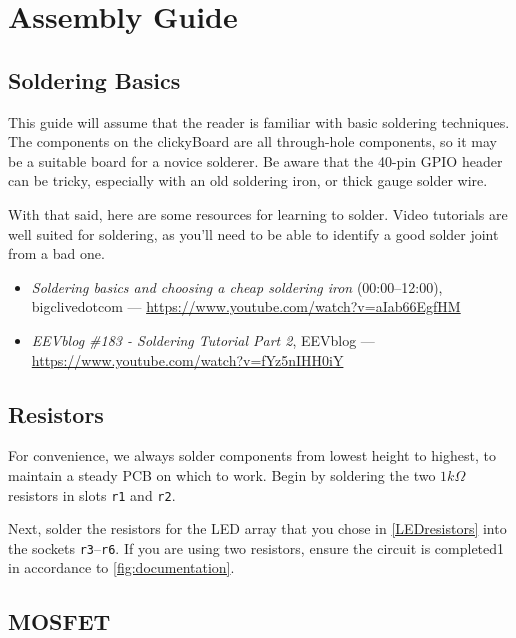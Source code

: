 \documentclass[10pt, a4paper, onesided]{article}
\begin{document}

\newpage
\section{Assembly Guide}

	\subsection*{Soldering Basics}
		This guide will assume that the reader is familiar with basic soldering techniques. The components on the clickyBoard are all through-hole components, so it may be a suitable board for a novice solderer. Be aware that the 40-pin GPIO header can be tricky, especially with an old soldering iron, or thick gauge solder wire.
		
		With that said, here are some resources for learning to solder. Video tutorials are well suited for soldering, as you'll need to be able to identify a good solder joint from a bad one.
		\begin{itemize}[nolistsep]
			\item \textit{Soldering basics and choosing a cheap soldering iron} (00:00--12:00), bigclivedotcom --- \url{https://www.youtube.com/watch?v=aIab66EgfHM}
			\item \textit{EEVblog \#183 - Soldering Tutorial Part 2}, EEVblog --- \url{https://www.youtube.com/watch?v=fYz5nIHH0iY}
		\end{itemize}
	
	\subsection*{Resistors}
	
		For convenience, we always solder components from lowest height to highest, to maintain a steady PCB on which to work. Begin by soldering the two $1 k\Omega$ resistors in slots \texttt{r1} and \texttt{r2}.
		
		Next, solder the resistors for the LED array that you chose in \autoref{LEDresistors} into the sockets \texttt{r3}--\texttt{r6}. If you are using two resistors, ensure the circuit is completed1 in accordance to \autoref*{fig:documentation}.
	
	\subsection*{MOSFET}
	
\end{document}
